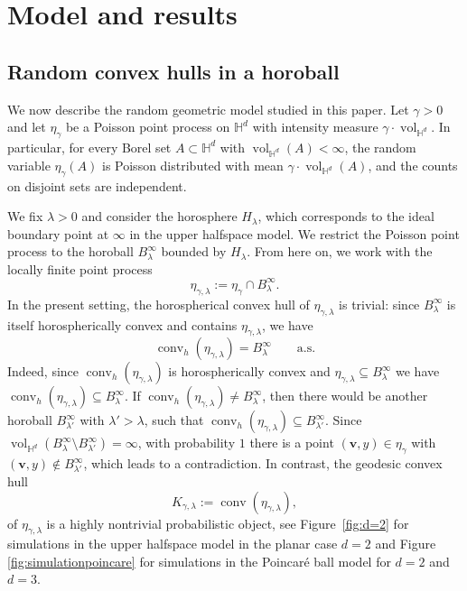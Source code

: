 \documentclass[11pt,a4paper]{article}
\theoremstyle{plain}
\theoremstyle{definition}
\theoremstyle{remark}
\newcommand{\vol}{\mathop{\mathrm{vol}}\nolimits}
\newcommand{\bv}{\boldsymbol{v}}
\def\HH{\mathbb{H}}
\newcommand{\conv}{\mathop{\mathrm{conv}}\nolimits}
\begin{document}
\section{Model and results}

\subsection{Random convex hulls in a horoball}

We now describe the random geometric model studied in this paper. Let $\gamma>0$ and let $\eta_{\gamma}$ be a Poisson point process on $\HH^d$ with intensity measure $\gamma\cdot\vol_{\HH^d}$. In particular, for every Borel set $A\subset\HH^d$ with $\vol_{\HH^d}(A)<\infty$, the random variable $\eta_{\gamma}(A)$ is Poisson distributed with mean $\gamma\cdot\vol_{\HH^d}(A)$, and the counts on disjoint sets are independent.

We fix $\lambda>0$ and consider the horosphere $H_\lambda$, which corresponds to the ideal boundary point at $\infty$ in the upper halfspace model. We restrict the Poisson point process to the horoball $B_\lambda^\infty$ bounded by $H_\lambda$. From here on, we work with the locally finite point process
\[
	\eta_{\gamma,\lambda}:=\eta_{\gamma}\cap B_\lambda^\infty.
\]
In the present setting, the horospherical convex hull of $\eta_{\gamma,\lambda}$ is trivial: since $B_\lambda^\infty$ is itself horospherically convex and contains $\eta_{\gamma,\lambda}$, we have
\[
	\conv_h(\eta_{\gamma,\lambda})=B_\lambda^\infty\qquad\text{a.s.}
\]
Indeed, since $\conv_h(\eta_{\gamma,\lambda})$ is horospherically convex and $\eta_{\gamma,\lambda}\subseteq B_\lambda^\infty$ we have $\conv_h(\eta_{\gamma,\lambda})\subseteq B_\lambda^\infty$. If $\conv_h(\eta_{\gamma,\lambda})\neq B_\lambda^\infty$, then there would be another horoball $B_{\lambda'}^\infty$ with $\lambda'>\lambda$, such that $\conv_h(\eta_{\gamma,\lambda})\subseteq B_{\lambda'}^\infty$. Since $\vol_{\HH^d}(B_{\lambda}^\infty\setminus B_{\lambda'}^\infty)=\infty$, with probability $1$ there is a point $(\bv,y)\in\eta_{\gamma}$ with $(\bv,y)\not\in B_{\lambda'}^\infty$, which leads to a contradiction. In contrast, the geodesic convex hull
\[
	K_{\gamma,\lambda}:=\conv(\eta_{\gamma,\lambda}),
\]
of $\eta_{\gamma,\lambda}$ is a highly nontrivial probabilistic object, see Figure~\ref{fig:d=2} for simulations in the upper halfspace model in the planar case $d=2$ and Figure \ref{fig:simulationpoincare} for simulations in the Poincar\'e ball model for $d=2$ and $d=3$.
\end{document}
